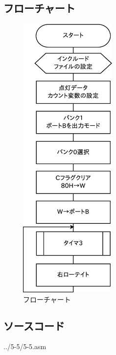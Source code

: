 \documentclass[a4paper,12pt]{ujarticle}
\begin{document}
  \subsection{フローチャート}
  \begin{figure}[htbp]
    \begin{center}
     \includegraphics[height=145mm]{Diagram5-5.eps}
    \end{center}
   \caption{フローチャート}
   \label{fig}
  \end{figure}
  \subsection{ソースコード}
  \begin{lstinputlisting}[basicstyle=\ttfamily\footnotesize, frame=single]
   {../5-5/5-5.asm}
  \end{lstinputlisting}
\end{document}
